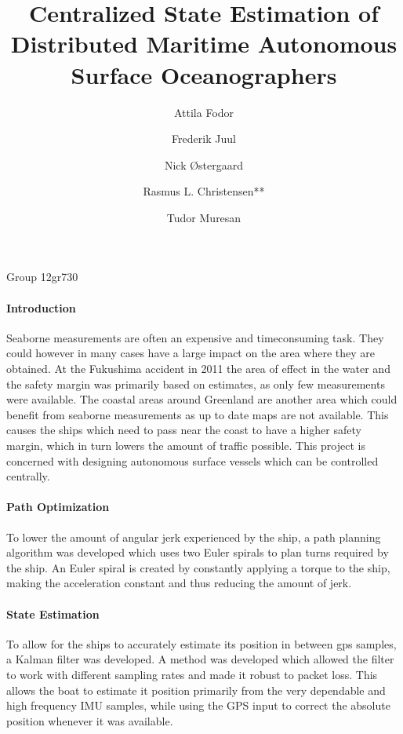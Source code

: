 \documentclass{memoir}
\begin{document}
\title{Centralized State Estimation of Distributed Maritime Autonomous Surface Oceanographers}
\author{Attila Fodor \and Frederik Juul \and Nick \O stergaard \and Rasmus L. Christensen** \and Tudor Muresan}
\maketitle
\begin{center}
\vspace{-0.7cm}
Group 12gr730
\end{center}
\thispagestyle{empty}
\paragraph{Introduction}
Seaborne measurements are often an expensive and timeconsuming task. They could however in many cases have a large impact on the area where they are obtained. At the Fukushima accident in 2011 the area of effect in the water and the safety margin was primarily based on estimates, as only few measurements were available. The coastal areas around Greenland are another area which could benefit from seaborne measurements as up to date maps are not available. This causes the ships which need to pass near the coast to have a higher safety margin, which in turn lowers the amount of traffic possible. This project is concerned with designing autonomous surface vessels which can be controlled centrally. 

\paragraph{Path Optimization}
To lower the amount of angular jerk experienced by the ship, a path planning algorithm was developed which uses two Euler spirals to plan turns required by the ship. An Euler spiral is created by constantly applying a torque to the ship, making the acceleration constant and thus reducing the amount of jerk. 

\paragraph{State Estimation}
To allow for the ships to accurately estimate its position in between gps samples, a Kalman filter was developed. A method was developed which allowed the filter to work with different sampling rates and made it robust to packet loss. This allows the boat to estimate it position primarily from the very dependable and high frequency IMU samples, while using the GPS input to correct the absolute position whenever it was available.
\end{document}
